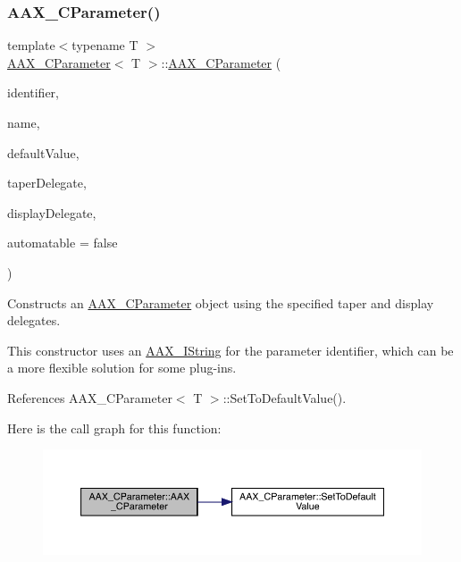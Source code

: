 \subsubsection{\texorpdfstring{AAX\_CParameter()}{AAX\_CParameter()}\hspace{0.1cm}{\footnotesize\ttfamily [2/4]}}
{\footnotesize\ttfamily template$<$typename T $>$ \\
\mbox{\hyperlink{a01537}{A\+A\+X\+\_\+\+C\+Parameter}}$<$ T $>$\+::\mbox{\hyperlink{a01537}{A\+A\+X\+\_\+\+C\+Parameter}} (\begin{DoxyParamCaption}\item[{const \mbox{\hyperlink{a01873}{A\+A\+X\+\_\+\+I\+String}} \&}]{identifier,  }\item[{const \mbox{\hyperlink{a01873}{A\+A\+X\+\_\+\+I\+String}} \&}]{name,  }\item[{T}]{default\+Value,  }\item[{const \mbox{\hyperlink{a01881}{A\+A\+X\+\_\+\+I\+Taper\+Delegate}}$<$ T $>$ \&}]{taper\+Delegate,  }\item[{const \mbox{\hyperlink{a01801}{A\+A\+X\+\_\+\+I\+Display\+Delegate}}$<$ T $>$ \&}]{display\+Delegate,  }\item[{bool}]{automatable = {\ttfamily false} }\end{DoxyParamCaption})}



Constructs an \mbox{\hyperlink{a01537}{A\+A\+X\+\_\+\+C\+Parameter}} object using the specified taper and display delegates. 

This constructor uses an \mbox{\hyperlink{a01873}{A\+A\+X\+\_\+\+I\+String}} for the parameter identifier, which can be a more flexible solution for some plug-\/ins. 

References A\+A\+X\+\_\+\+C\+Parameter$<$ T $>$\+::\+Set\+To\+Default\+Value().

Here is the call graph for this function\+:
\nopagebreak
\begin{figure}[H]
\begin{center}
\leavevmode
\includegraphics[width=350pt]{a01537_a45c6e7e8975b0ab682785b395b80c31f_cgraph}
\end{center}
\end{figure}
\mbox{\label{a01537_af91631db027f09bc8918082c842d1719}} 
